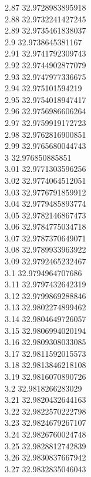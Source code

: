 {2.87	32.9728983895918\\
2.88	32.9732241427245\\
2.89	32.9735461838037\\
2.9	32.9738645381167\\
2.91	32.9741792309743\\
2.92	32.9744902877079\\
2.93	32.9747977336675\\
2.94	32.975101594219\\
2.95	32.9754018947417\\
2.96	32.9756986606264\\
2.97	32.9759919172723\\
2.98	32.9762816900851\\
2.99	32.9765680044743\\
3	32.976850885851\\
3.01	32.9771303596256\\
3.02	32.9774064512051\\
3.03	32.9776791859912\\
3.04	32.9779485893774\\
3.05	32.9782146867473\\
3.06	32.9784775034718\\
3.07	32.9787370649071\\
3.08	32.9789933963922\\
3.09	32.9792465232467\\
3.1	32.9794964707686\\
3.11	32.9797432642319\\
3.12	32.9799869288846\\
3.13	32.9802274899462\\
3.14	32.9804649726057\\
3.15	32.9806994020194\\
3.16	32.9809308033085\\
3.17	32.9811592015573\\
3.18	32.9813846218108\\
3.19	32.9816070890726\\
3.2	32.9818266283029\\
3.21	32.9820432644163\\
3.22	32.9822570222798\\
3.23	32.9824679267107\\
3.24	32.9826760024748\\
3.25	32.9828812742839\\
3.26	32.9830837667942\\
3.27	32.9832835046043\\
}
